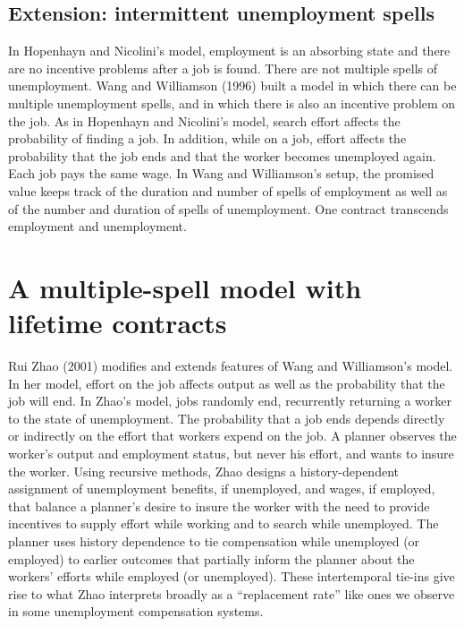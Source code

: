 \newpage

\subsection{Extension: intermittent unemployment spells}
In Hopenhayn and Nicolini's model, employment is an absorbing
state and there are no incentive problems after a job is found.
There are not multiple spells of unemployment.   Wang and
Williamson (1996) built a model in which there can be multiple
unemployment spells, and in which there is also an incentive
problem on the job.  As in Hopenhayn and Nicolini's model, search
effort affects the probability of finding  a job.  In addition,
while on a job, effort affects the probability that the job ends
and that the worker becomes unemployed again.  Each job pays the
same wage.   In Wang and Williamson's setup, the promised value
keeps track of the duration and number of spells of employment as
well as of the number and duration of spells of unemployment.  One
contract transcends employment and unemployment.

\section{A multiple-spell model with lifetime contracts}
  Rui Zhao (2001) modifies and extends features of Wang and Williamson's
model.  In her model, effort on the job affects output as well as the
probability that the job will end.  In Zhao's model, jobs randomly end,
recurrently returning a worker to the state of unemployment.  The
probability that a job ends depends directly or indirectly
on the effort that workers expend on the job.  A planner observes
the worker's output and employment status, but never his effort,
and  wants to insure the worker.  Using recursive methods,
Zhao designs  a history-dependent assignment of unemployment benefits,
if unemployed, and wages, if employed, that balance a planner's
desire to insure the worker with the need to provide incentives to
supply effort while  working and to search while unemployed.  The planner uses history dependence
to tie compensation while unemployed (or employed) to earlier outcomes
that partially inform the planner about the workers' efforts while
employed (or unemployed).  These intertemporal tie-ins give rise to
what Zhao interprets broadly as a ``replacement rate'' like ones we observe in some 
unemployment compensation systems.

